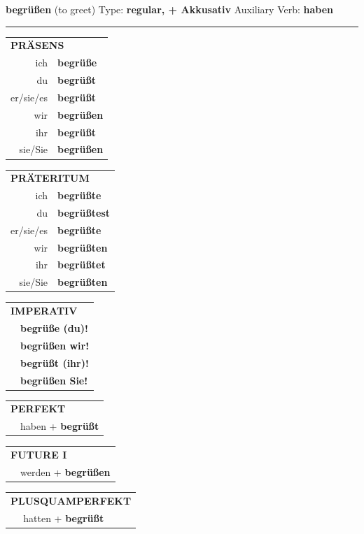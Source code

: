 \documentclass[10pt,a4paper]{revtex4-2}
\begin{document}
\begin{verbbox-acc}
{\Large \bf begrüßen} (to greet) \hfill Type: \textbf{regular, + Akkusativ} \hfill Auxiliary Verb: \textbf{haben}

\vspace{5pt}
\hrule
\vspace{5pt}

\begin{tabular}{rl}
\multicolumn{2}{l}{\textbf{PRÄSENS}}\\
ich & \textbf{begrüße}\\
du & \textbf{begrüßt}\\
er/sie/es & \textbf{begrüßt}\\
wir & \textbf{begrüßen}\\
ihr & \textbf{begrüßt}\\
sie/Sie & \textbf{begrüßen}\\
\end{tabular}
\hfill
\begin{tabular}{rl}
\multicolumn{2}{l}{\textbf{PRÄTERITUM}}\\
ich & \textbf{begrüßte}\\
du & \textbf{begrüßtest}\\
er/sie/es & \textbf{begrüßte}\\
wir & \textbf{begrüßten}\\
ihr & \textbf{begrüßtet}\\
sie/Sie & \textbf{begrüßten}\\
\end{tabular}
\hfill
\begin{tabular}{rl}
\multicolumn{2}{l}{\textbf{IMPERATIV}}\\
& \textbf{begrüße (du)!}\\
& \textbf{begrüßen wir!}\\
& \textbf{begrüßt (ihr)!}\\
& \textbf{begrüßen Sie!}\\
\end{tabular}

\vspace{10pt}

\begin{tabular}{rl}
\multicolumn{2}{l}{\textbf{PERFEKT}}\\
& haben + \textbf{begrüßt}\\
\end{tabular}
\hfill
\begin{tabular}{rl}
\multicolumn{2}{l}{\textbf{FUTURE I}}\\
& werden + \textbf{begrüßen}\\
\end{tabular}
\hfill
\begin{tabular}{rl}
\multicolumn{2}{l}{\textbf{PLUSQUAMPERFEKT}}\\
& hatten + \textbf{begrüßt}\\
\end{tabular}


\end{verbbox-acc}
\end{document}
